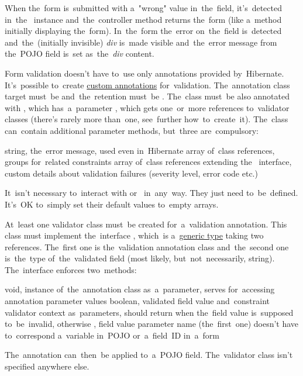 \noindent When the~form is~submitted with a~"wrong" value in~the~field, it's~detected in~the~ instance and~the~controller method returns the~form (like a~method initially displaying the~form).
In~the~form the~error on~the~field is~detected and~the~(initially invisible) \textit{div} is~made visible and~the~error message from the~POJO field is~set as~the~\textit{div} content.

Form validation doesn't have to~use only annotations provided by~Hibernate.
It's~possible to~create \hyperref[javacustomannotations]{custom annotations} for~validation.
The~annotation class target must~be  and~the~retention must~be .
The~class must~be also annotated with , which has~a~parameter , which gets one~or~more references to~validator classes (there's rarely more than~one, see~further how~to~create~it).
The~class can~contain additional parameter methods, but~three are~compulsory:
\begin{itemize}
     string, the~error message, used even in~Hibernate
     array of~class references, groups for~related constraints
     array of~class references extending the~ interface, custom details about validation failures (severity level, error code etc.)
\end{itemize}
\noindent It~isn't necessary to~interact with  or~ in~any~way.
They just need to~be~defined.
It's~OK to~simply set their default values to~empty arrays.

At~least one validator class must~be created for~a~validation annotation.
This class must implement the~interface , which~is a~\hyperref[javagenerics]{generic type} taking two references.
The~first one is the~validation annotation class and~the~second one is~the~type of~the~validated field (most likely, but~not~necessarily, string).
The~interface enforces two~methods:
\begin{itemize}
     void, instance of~the~annotation class as~a~parameter, serves for~accessing annotation parameter values
     boolean, validated field value and~constraint validator context as~parameters, should return  when the~field value is~supposed to~be~invalid, otherwise , field value parameter name (the~first~one) doesn't have to~correspond a~variable in~POJO or~a~field~ID in~a~form
\end{itemize}
The~annotation can~then~be applied to~a~POJO field.
The~validator class isn't specified anywhere else.
\newpage

